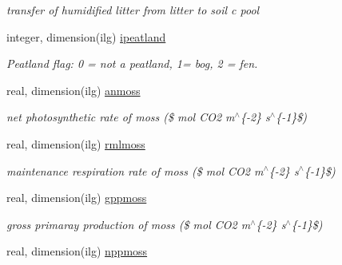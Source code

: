 \begin{DoxyCompactItemize}
\begin{DoxyCompactList}\small\item\em transfer of humidified litter from litter to soil c pool \end{DoxyCompactList}\item 
\hypertarget{structctem__statevars_1_1veg__gat_a31638701bf8be635918566d4f57d3b63}{}integer, dimension(ilg) \hyperlink{structctem__statevars_1_1veg__gat_a31638701bf8be635918566d4f57d3b63}{ipeatland}\label{structctem__statevars_1_1veg__gat_a31638701bf8be635918566d4f57d3b63}

\begin{DoxyCompactList}\small\item\em Peatland flag\+: 0 = not a peatland, 1= bog, 2 = fen. \end{DoxyCompactList}\item 
\hypertarget{structctem__statevars_1_1veg__gat_ae69e36cf6928e8c9dca33c8313decafe}{}real, dimension(ilg) \hyperlink{structctem__statevars_1_1veg__gat_ae69e36cf6928e8c9dca33c8313decafe}{anmoss}\label{structctem__statevars_1_1veg__gat_ae69e36cf6928e8c9dca33c8313decafe}

\begin{DoxyCompactList}\small\item\em net photosynthetic rate of moss (\$ mol C\+O2 m$^\wedge$\{-\/2\} s$^\wedge$\{-\/1\}\$) \end{DoxyCompactList}\item 
\hypertarget{structctem__statevars_1_1veg__gat_ad6f99989dfd17eee75af3d6c79890339}{}real, dimension(ilg) \hyperlink{structctem__statevars_1_1veg__gat_ad6f99989dfd17eee75af3d6c79890339}{rmlmoss}\label{structctem__statevars_1_1veg__gat_ad6f99989dfd17eee75af3d6c79890339}

\begin{DoxyCompactList}\small\item\em maintenance respiration rate of moss (\$ mol C\+O2 m$^\wedge$\{-\/2\} s$^\wedge$\{-\/1\}\$) \end{DoxyCompactList}\item 
\hypertarget{structctem__statevars_1_1veg__gat_aceeddbe4e65540b7bb1e2e5033762023}{}real, dimension(ilg) \hyperlink{structctem__statevars_1_1veg__gat_aceeddbe4e65540b7bb1e2e5033762023}{gppmoss}\label{structctem__statevars_1_1veg__gat_aceeddbe4e65540b7bb1e2e5033762023}

\begin{DoxyCompactList}\small\item\em gross primaray production of moss (\$ mol C\+O2 m$^\wedge$\{-\/2\} s$^\wedge$\{-\/1\}\$) \end{DoxyCompactList}\item 
\hypertarget{structctem__statevars_1_1veg__gat_a15e2b67027c0873f207c8322f0b7a67e}{}real, dimension(ilg) \hyperlink{structctem__statevars_1_1veg__gat_a15e2b67027c0873f207c8322f0b7a67e}{nppmoss}\label{structctem__statevars_1_1veg__gat_a15e2b67027c0873f207c8322f0b7a67e}


\end{DoxyCompactItemize}
